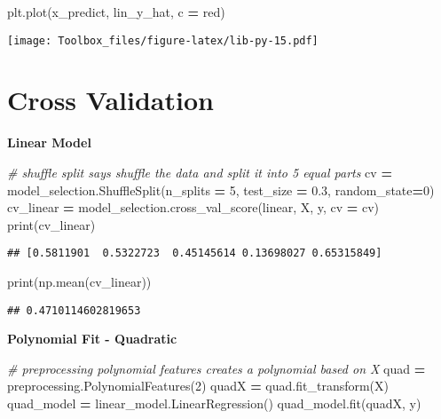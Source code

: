 \documentclass[
]{book}
\newenvironment{Shaded}{\begin{snugshade}}{\end{snugshade}}
\newcommand{\BuiltInTok}[1]{#1}
\newcommand{\CommentTok}[1]{\textcolor[rgb]{0.56,0.35,0.01}{\textit{#1}}}
\newcommand{\DecValTok}[1]{\textcolor[rgb]{0.00,0.00,0.81}{#1}}
\newcommand{\FloatTok}[1]{\textcolor[rgb]{0.00,0.00,0.81}{#1}}
\newcommand{\NormalTok}[1]{#1}
\newcommand{\OperatorTok}[1]{\textcolor[rgb]{0.81,0.36,0.00}{\textbf{#1}}}
\newcommand{\StringTok}[1]{\textcolor[rgb]{0.31,0.60,0.02}{#1}}
\begin{document}
\begin{Shaded}
\begin{Highlighting}[]
\NormalTok{plt.plot(x\_predict, lin\_y\_hat, c }\OperatorTok{=} \StringTok{\textquotesingle{}red\textquotesingle{}}\NormalTok{)}
\end{Highlighting}
\end{Shaded}

\texttt{[image: Toolbox\_files/figure-latex/lib-py-15.pdf]}

\hypertarget{cross-validation}{%
\section{Cross Validation}\label{cross-validation}}

\textbf{Linear Model}

\begin{Shaded}
\begin{Highlighting}[]
\CommentTok{\# shuffle split says \textquotesingle{}shuffle the data\textquotesingle{} and split it into 5 equal parts}
\NormalTok{cv }\OperatorTok{=}\NormalTok{ model\_selection.ShuffleSplit(n\_splits }\OperatorTok{=} \DecValTok{5}\NormalTok{, test\_size }\OperatorTok{=} \FloatTok{0.3}\NormalTok{, random\_state}\OperatorTok{=}\DecValTok{0}\NormalTok{)}
\NormalTok{cv\_linear }\OperatorTok{=}\NormalTok{ model\_selection.cross\_val\_score(linear, X, y, cv }\OperatorTok{=}\NormalTok{ cv)}
\BuiltInTok{print}\NormalTok{(cv\_linear)}
\end{Highlighting}
\end{Shaded}

\begin{verbatim}
## [0.5811901  0.5322723  0.45145614 0.13698027 0.65315849]
\end{verbatim}

\begin{Shaded}
\begin{Highlighting}[]
\BuiltInTok{print}\NormalTok{(np.mean(cv\_linear))}
\end{Highlighting}
\end{Shaded}

\begin{verbatim}
## 0.4710114602819653
\end{verbatim}

\textbf{Polynomial Fit - Quadratic}

\begin{Shaded}
\begin{Highlighting}[]
\CommentTok{\# preprocessing polynomial features creates a polynomial based on X}
\NormalTok{quad }\OperatorTok{=}\NormalTok{ preprocessing.PolynomialFeatures(}\DecValTok{2}\NormalTok{)}
\NormalTok{quadX }\OperatorTok{=}\NormalTok{ quad.fit\_transform(X)}
\NormalTok{quad\_model }\OperatorTok{=}\NormalTok{ linear\_model.LinearRegression()}
\NormalTok{quad\_model.fit(quadX, y)}
\end{Highlighting}
\end{Shaded}
\end{document}
